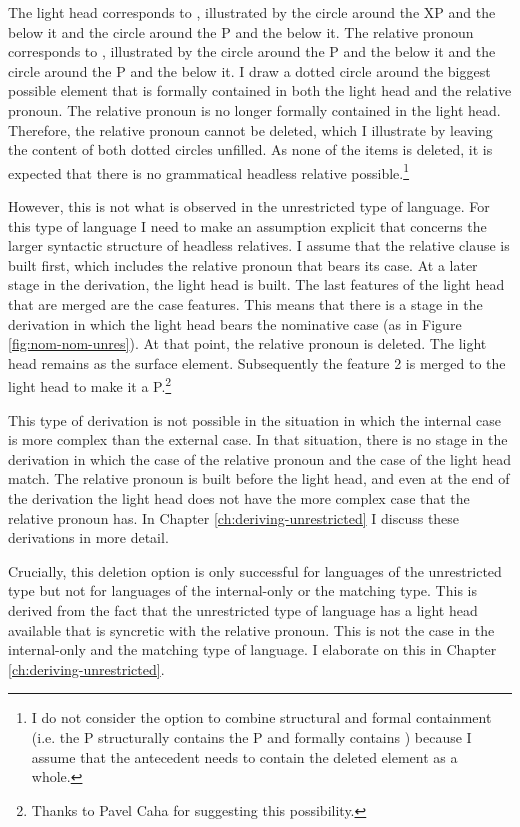 The light head corresponds to , illustrated by the circle around the XP and the  below it and the circle around the P and the  below it. The relative pronoun corresponds to , illustrated by the circle around the P and the  below it and the circle around the P and the  below it.
I draw a dotted circle around the biggest possible element that is formally contained in both the light head and the relative pronoun.
The relative pronoun is no longer formally contained in the light head. Therefore, the relative pronoun cannot be deleted, which I illustrate by leaving the content of both dotted circles unfilled.
As none of the items is deleted, it is expected that there is no grammatical headless relative possible.\footnote{
I do not consider the option to combine structural and formal containment (i.e. the P structurally contains the P and  formally contains ) because I assume that the antecedent needs to contain the deleted element as a whole.
}

However, this is not what is observed in the unrestricted type of language.
For this type of language I need to make an assumption explicit that concerns the larger syntactic structure of headless relatives. I assume that the relative clause is built first, which includes the relative pronoun that bears its case.
At a later stage in the derivation, the light head is built. The last features of the light head that are merged are the case features. This means that there is a stage in the derivation in which the light head bears the nominative case (as in Figure \ref{fig:nom-nom-unres}). At that point, the relative pronoun is deleted. The light head remains as the surface element. Subsequently the feature 2 is merged to the light head to make it a P.\footnote{
Thanks to Pavel Caha for suggesting this possibility.
}

This type of derivation is not possible in the situation in which the internal case is more complex than the external case. In that situation, there is no stage in the derivation in which the case of the relative pronoun and the case of the light head match. The relative pronoun is built before the light head, and even at the end of the derivation the light head does not have the more complex case that the relative pronoun has.
In Chapter \ref{ch:deriving-unrestricted} I discuss these derivations in more detail.

Crucially, this deletion option is only successful for languages of the unrestricted type but not for languages of the internal-only or the matching type. This is derived from the fact that the unrestricted type of language has a light head available that is syncretic with the relative pronoun. This is not the case in the internal-only and the matching type of language. I elaborate on this in Chapter \ref{ch:deriving-unrestricted}.

